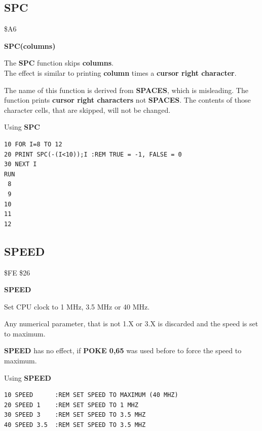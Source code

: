 
\newpage
\subsection{SPC}
\begin{description}[leftmargin=2cm,style=nextline]
\item [Token:] \$A6
\item [Format:] {\bf SPC(columns)}
\item [Usage:] The {\bf SPC} function skips {\bf columns}. \\
               The effect is similar to printing {\bf column}
               times a {\bf cursor right character}.

\item [Remarks:] The name of this function is derived from
                 {\bf SPACES}, which is misleading.
                 The function prints {\bf cursor right characters}
                 not {\bf SPACES}. The contents of those character
                 cells, that are skipped, will not be changed.

\item [Example:] Using {\bf SPC}
\begin{tcolorbox}[colback=black,coltext=white]
\verbatimfont{\codefont}
\begin{verbatim}
10 FOR I=8 TO 12
20 PRINT SPC(-(I<10));I :REM TRUE = -1, FALSE = 0
30 NEXT I
RUN
 8
 9
10
11
12
\end{verbatim}
\end{tcolorbox}
\end{description}


\newpage
\subsection{SPEED}
\begin{description}[leftmargin=2cm,style=nextline]
\item [Token:] \$FE \$26
\item [Format:] {\bf SPEED}
\item [Usage:] Set CPU clock to 1 MHz, 3.5 MHz or 40 MHz.
\item [Remarks:] Any numerical parameter, that is not 1.X or 3.X
                 is discarded and the speed is set to maximum.

                 {\bf SPEED} has no effect, if {\bf POKE 0,65}
                 was used before to force the speed to maximum.

\item [Example:] Using {\bf SPEED}
\begin{tcolorbox}[colback=black,coltext=white]
\verbatimfont{\codefont}
\begin{verbatim}
10 SPEED      :REM SET SPEED TO MAXIMUM (40 MHZ)
20 SPEED 1    :REM SET SPEED TO 1 MHZ
30 SPEED 3    :REM SET SPEED TO 3.5 MHZ
40 SPEED 3.5  :REM SET SPEED TO 3.5 MHZ
\end{verbatim}
\end{tcolorbox}
\end{description}


